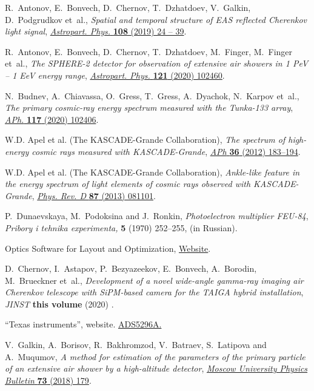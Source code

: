 \documentclass[a4paper,11pt]{article}
\begin{document}
\begin{thebibliography}{10}
R.~Antonov, E.~Bonvech, D.~Chernov, T.~Dzhatdoev, V.~Galkin, D.~Podgrudkov  et~al., \emph{Spatial and temporal structure of EAS reflected Cherenkov light signal}, \href{http://dx.doi.org/10.1016/j.astropartphys.2019.01.002}{\emph{Astropart. Phys.} {\bfseries 108} (2019) 24 -- 39}.

R.~Antonov, E.~Bonvech, D.~Chernov, T.~Dzhatdoev, M.~Finger, M.~Finger et~al., \emph{The SPHERE-2 detector for observation of extensive air showers in 1 PeV -- 1 EeV energy range}, \href{http://dx.doi.org/10.1016/j.astropartphys.2020.102460}{\emph{Astropart. Phys.} {\bfseries 121} (2020) 102460}.

N.~Budnev, A.~Chiavassa, O.~Gress, T.~Gress, A.~Dyachok, N.~Karpov et~al., \emph{The primary cosmic-ray energy spectrum measured with the Tunka-133 array}, \href{http://dx.doi.org/10.1016/j.astropartphys.2019.102406}{\emph{APh.} {\bfseries 117} (2020) 102406}.

{W.D. Apel et al. (The KASCADE-Grande Collaboration)}, \emph{{The spectrum of high-energy cosmic rays measured with KASCADE-Grande}}, \href{https://doi.org/10.1016/j.astropartphys.2012.05.023}{{\emph{APh} {\bfseries 36} (2012) 183--194}}.

{W.D. Apel et al. (The KASCADE-Grande Collaboration)}, \emph{Ankle-like feature in the energy spectrum of light elements of cosmic rays observed with KASCADE-Grande}, \href{https://doi.org/10.1103/PhysRevD.87.081101}{{\emph{Phys. Rev. D} {\bfseries 87} (2013) 081101}}.

P.~Dunaevskaya, M.~Podoksina and J.~Ronkin, \emph{Photoelectron multiplier FEU-84}, {\emph{Pribory i tehnika experimenta,} {\bfseries 5} (1970) 252--255},  (in Russian).

{Optics Software for Layout and Optimization}, \href{https://www.lambdares.com/oslo}{Website}.

D.~Chernov, I.~Astapov, P.~Bezyazeekov, E.~Bonvech, A.~Borodin, M.~Brueckner et~al., \emph{Development of a novel wide-angle gamma-ray imaging air Cherenkov telescope with SiPM-based camera for the TAIGA hybrid installation}, {\emph{JINST} {\bfseries this volume} (2020) }.

``Texas instruments'', website. \href{https://www.ti.com/product/ADS5296A}{ADS5296A.}

V.~Galkin, A.~Borisov, R.~Bakhromzod, V.~Batraev, S.~Latipova and A.~Muqumov, \emph{A method for estimation of the parameters of the primary particle of an extensive air shower by a high-altitude detector}, \href{http://dx.doi.org/10.3103/S0027134918020078}{\emph{Moscow University Physics Bulletin} {\bfseries 73} (2018) 179}.


\end{thebibliography}
\end{document}
